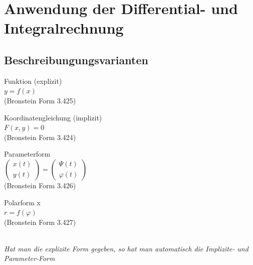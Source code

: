 \section{Anwendung der Differential- und Integralrechnung}

\subsection{Beschreibungungsvarianten}
  \begin{minipage}[t]{3.5cm}
    Funktion (explizit) \\
    $ y = f(x)$ \\
        \tiny{(Bronstein Form 3.425)}
  \end{minipage}
  \begin{minipage}[t]{6cm}    
    Koordinatengleichung (implizit) \\
    $ F(x,y) = 0 $ \\
        \tiny{(Bronstein Form 3.424)}
  \end{minipage}
  \begin{minipage}[t]{5.5cm}    
    Parameterform \\
    $ \left( \begin{array} {l} x(t) \\ y(t) \end{array} \right) =
          \left( \begin{array} {l} \Psi(t) \\ \varphi(t) \end{array} \right)$\\
        \tiny{(Bronstein Form 3.426)}
  \end{minipage} 
  \begin{minipage}[t]{3cm}
      Polarform x\\
      $ r=f(\varphi) $ \\
        \tiny{(Bronstein Form 3.427)}
    \end{minipage}\\

  \textit{Hat man die explizite Form gegeben, so hat man automatisch die
  Implizite- und Parameter-Form}


